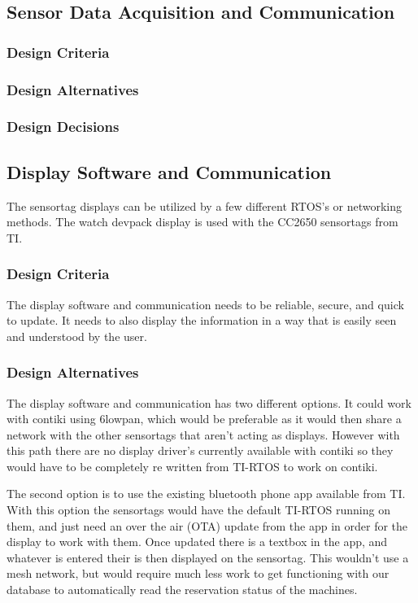\documentclass[PPFS.tex]{template/subfiles}
\begin{document}
\subsection{Sensor Data Acquisition and Communication}

\subsubsection{Design Criteria}

\subsubsection{Design Alternatives}

\subsubsection{Design Decisions}

\subsection{Display Software and Communication}
The sensortag displays can be utilized by a few different RTOS's or networking methods. The watch devpack display is used with the CC2650 sensortags from TI. 

\subsubsection{Design Criteria}
The display software and communication needs to be reliable, secure, and quick to update. It needs to also display the information in a way that is easily seen and understood by the user. 

\subsubsection{Design Alternatives}
The display software and communication has two different options. It could work with contiki using 6lowpan, which would be preferable as it would then share a network with the other sensortags that aren't acting as displays. However with this path there are no display driver's currently available with contiki so they would have to be completely re written from TI-RTOS to work on contiki. 

The second option is to use the existing bluetooth phone app available from TI. With this option the sensortags would have the default TI-RTOS running on them, and just need an over the air (OTA) update from the app in order for the display to work with them. Once updated there is a textbox in the app, and whatever is entered their is then displayed on the sensortag. This wouldn't use a mesh network, but would require much less work to get functioning with our database to automatically read the reservation status of the machines. 
\end{document}
